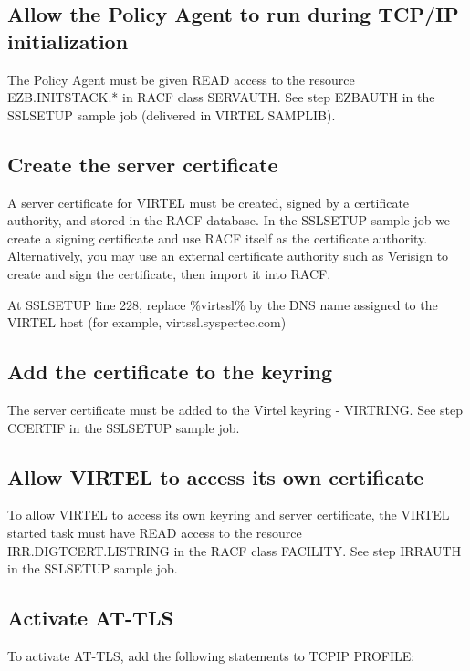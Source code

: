 \documentclass[letterpaper,10pt,english]{sphinxmanual}
\begin{document}
\subsection{Allow the Policy Agent to run during TCP/IP initialization}
\label{\detokenize{connectivity_guide:allow-the-policy-agent-to-run-during-tcp-ip-initialization}}
The Policy Agent must be given READ access to the resource EZB.INITSTACK.* in RACF class SERVAUTH. See step EZBAUTH in the SSLSETUP sample job (delivered in VIRTEL SAMPLIB).


\subsection{Create the server certificate}
\label{\detokenize{connectivity_guide:create-the-server-certificate}}
A server certificate for VIRTEL must be created, signed by a certificate authority, and stored in the RACF database. In the SSLSETUP sample job we create a signing certificate and use RACF itself as the certificate authority. Alternatively, you may use an external certificate authority such as Verisign to create and sign the certificate, then import it into RACF.

At SSLSETUP line 228, replace \%virtssl\% by the DNS name assigned to the VIRTEL host (for example, virtssl.syspertec.com)


\subsection{Add the certificate to the keyring}
\label{\detokenize{connectivity_guide:add-the-certificate-to-the-keyring}}
The server certificate must be added to the Virtel keyring - VIRTRING. See step CCERTIF in the SSLSETUP sample job.


\subsection{Allow VIRTEL to access its own certificate}
\label{\detokenize{connectivity_guide:allow-virtel-to-access-its-own-certificate}}
To allow VIRTEL to access its own keyring and server certificate, the VIRTEL started task must have READ access to the resource IRR.DIGTCERT.LISTRING in the RACF class FACILITY. See step IRRAUTH in the SSLSETUP sample job.


\subsection{Activate AT-TLS}
\label{\detokenize{connectivity_guide:activate-at-tls}}
To activate AT-TLS, add the following statements to TCPIP PROFILE:
\end{document}
